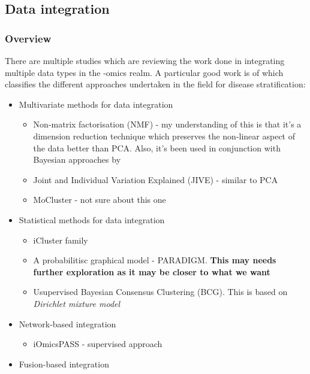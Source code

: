 
\subsection{Data integration}

\subsubsection{Overview}

There are multiple studies \citet{Menyhart2021-ef, Subramanian2020-tk, Picard2021-qr, Reel2021-sg} which are reviewing the work done in integrating multiple data types in the -omics realm. A particular good work is of \citet{Menyhart2021-ef} which classifies the different approaches undertaken in the field for disease stratification:
\begin{itemize}
    \item Multivariate methods for data integration
        \begin{itemize}
            \item Non-matrix factorisation (NMF) - my understanding of this is that it's a dimension reduction technique which preserves the non-linear aspect of the data better than PCA. Also, it's been used in conjunction with Bayesian approaches by \citet{Robertson2017-mg}
            \item Joint and Individual Variation Explained (JIVE) - similar to PCA
            \item MoCluster \cite{Meng2016-ui} - not sure about this one
        \end{itemize}
    \item Statistical methods for data integration
        \begin{itemize}
            \item iCluster family \citet{Shen2009-ew, Mo2013-zi, Mo2018-el}
            \item A probabilitisc graphical model - PARADIGM. \textbf{This may needs further exploration as it may be closer to what we want}
            \item Usupervised Bayesian Consensus Clustering (BCG). This is based on \textit{Dirichlet mixture model}
        \end{itemize}
    \item Network-based integration
        \begin{itemize}
            \item iOmicsPASS - supervised approach
        \end{itemize}
    \item Fusion-based integration

\end{itemize}
